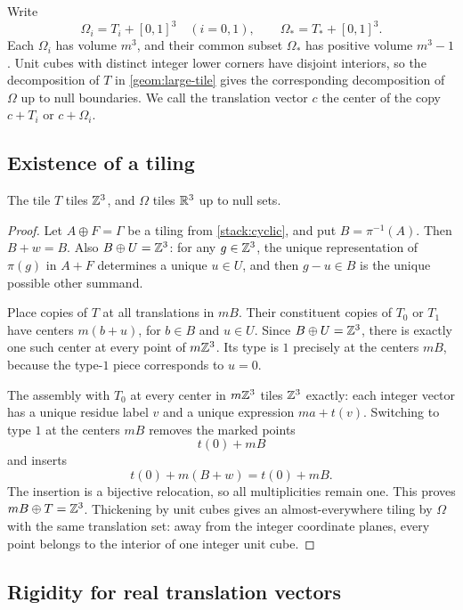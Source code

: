 Write
\[
 \Omega_i=T_i+[0,1]^3\quad(i=0,1),\qquad
 \Omega_*=T_*+[0,1]^3.
\]
Each $\Omega_i$ has volume $m^3$, and their common subset $\Omega_*$
has positive volume $m^3-1$.  Unit cubes with distinct integer lower
corners have disjoint interiors, so the decomposition of $T$ in
\cref{geom:large-tile} gives the corresponding decomposition of
$\Omega$ up to null boundaries.
We call the translation vector $c$ the center of the copy $c+T_i$
or $c+\Omega_i$.

\subsection{Existence of a tiling}

\begin{proposition}
\label{geom:existence}
The tile $T$ tiles $\mathbb Z^3$, and $\Omega$ tiles $\mathbb R^3$ up to null sets.
\end{proposition}

\begin{proof}
Let $A\oplus F=\Gamma$ be a tiling from \cref{stack:cyclic}, and put
$B=\pi^{-1}(A)$.  Then $B+w=B$.  Also
$B\oplus U=\mathbb Z^3$: for any $g\in\mathbb Z^3$, the unique representation of
$\pi(g)$ in $A+F$ determines a unique $u\in U$, and then $g-u\in B$
is the unique possible other summand.

Place copies of $T$ at all translations in $mB$.  Their constituent
copies of $T_0$ or $T_1$ have centers $m(b+u)$, for $b\in B$ and
$u\in U$.  Since $B\oplus U=\mathbb Z^3$, there is exactly one such center
at every point of $m\mathbb Z^3$.  Its type is $1$ precisely at the centers
$mB$, because the type-$1$ piece corresponds to $u=0$.

The assembly with $T_0$ at every center in $m\mathbb Z^3$ tiles $\mathbb Z^3$
exactly: each integer vector has a unique residue label $v$ and a
unique expression $ma+t(v)$.  Switching to type $1$ at the centers
$mB$ removes the marked points
\[
 t(0)+mB
\]
and inserts
\[
 t(0)+m(B+w)=t(0)+mB.
\]
The insertion is a bijective relocation, so all multiplicities
remain one.  This proves $mB\oplus T=\mathbb Z^3$.  Thickening by unit
cubes gives an almost-everywhere tiling by $\Omega$ with the same
translation set: away from the integer coordinate planes, every
point belongs to the interior of one integer unit cube.
\end{proof}

\subsection{Rigidity for real translation vectors}

